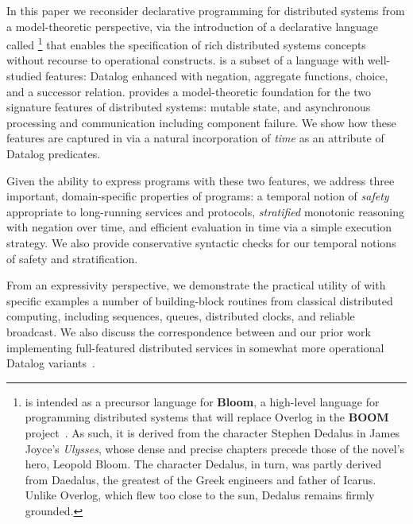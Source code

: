 In this paper we reconsider declarative programming for distributed systems from a model-theoretic perspective, via the introduction of a declarative language called \lang\footnote{\small
\lang is intended as a precursor language for \textbf{Bloom}, a high-level language for programming distributed systems that
will replace Overlog in the \textbf{BOOM} project~\cite{boom-techr}.  
As such, it is derived from the character Stephen Dedalus in James Joyce's \emph{Ulysses}, whose dense and precise chapters 
precede those of the novel's hero, Leopold Bloom.  The character Dedalus, in turn, was partly derived from Daedalus, the greatest
of the Greek engineers and father of Icarus.  Unlike Overlog, which flew too close to the sun, Dedalus remains firmly grounded.
} that enables the specification of rich distributed systems concepts without recourse to operational constructs.   \lang is a subset of a language with well-studied features: Datalog enhanced with negation, aggregate functions, choice, and a successor relation.  \lang provides a model-theoretic foundation for the two signature features of 
distributed systems: mutable state, and asynchronous processing and communication including component failure.  We show how these features are captured in \lang via a natural incorporation of {\em time} as an attribute of Datalog predicates.

Given the ability to express programs with these two features, we address three important, domain-specific properties of \lang programs: a temporal notion of {\em safety} appropriate to long-running services and protocols, {\em stratified} monotonic reasoning with negation over time, and efficient evaluation
in time via a simple execution strategy.  We also provide conservative syntactic checks
for our temporal notions of safety and stratification.  

From an expressivity perspective, we demonstrate the practical utility of \lang with specific examples a number of building-block routines from classical distributed computing, including sequences, queues, distributed clocks, and reliable broadcast.  We also discuss the correspondence between \lang and our prior work implementing full-featured distributed services in somewhat more operational Datalog variants~\cite{Loo2009-CACM,boom-techr}.

